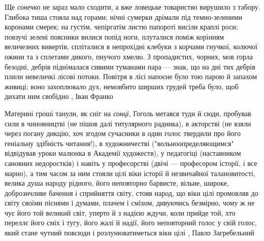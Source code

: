 Ще \emph{сонечко} не зараз мало сходити, а вже ловецьке товариство вирушило з табору.
Глибока тиша стояла над горами; нічні сумерки дрімали під темно-зеленими
коронами смерек; на густім, чепіргатім листю папороті висіли краплі роси;
повзучі зелені поясники вилися попід ноги, плуталися поміж корінням величезних
вивертів, спліталися в непрохідні клебуки з корчами гнучкої, колючої ожини та з
сплетами дикого, пнучого хмелю. З пропадистих, чорних, мов горла безодні,
дебрів піднімалася сивими туманами пара — знак, що на дні тих дебрів плили
невеличкі лісові потоки. Повітря в лісі напоєне було тою парою й запахом
живиці; воно захоплювало дух, немовбито ширших грудей треба було, щоб дихати
ним свобідно
, Іван Франко

Материні гроші танули, як сніг на \emph{сонці}, Гоголь метався туди й сюди, пробував
сили в чиновництві (не пішов далі титулярного радника), в акторстві (не взяли
через погану дикцію, хоч згодом сучасники в один голос твердили про його
геніальну здібність читання!), в художничестві ("вольноопределяющимся"
відвідував уроки малюнка в Академії художеств), у педагогіці (наставником
сановних недоростків) і навіть у професорстві (двічі — професором історії, і
все марно), а тим часом за ним стояли цілі віки історії й незвичайної
талановитості, велика душа народу рідного, його неповторно барвисте, вільне,
широке, доброзичливе бачення і сприйняття світу, стояв народ, що віки цілі
промовляв до світу своїми піснями і думами, плачем і сміхом, дивуючись
безмірно, чому ж не чує його той великий світ, уперто й з надією ждучи, коли
прийде той, хто переллє його сміх і тугу, його жалі й надії, його неповторний
голос у свій голос, який стане чутний повсюди і розлунюватиметься віки цілі
, Павло Загребельний
